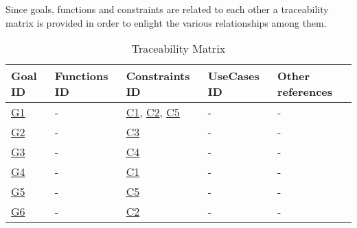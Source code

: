 Since goals, functions and constraints are related to each other a traceability matrix is provided in order to enlight the various relationships among them.
\begin{flushleft}

\begin{table}[htp]

\begin{tabular}{|l|l|l|l|l|}
\hline
Goal ID&Functions ID&Constraints ID&UseCases ID&Other references\\
\hline
\hyperlink{G1}{G1}&-&\hyperlink{C1}{C1}, \hyperlink{C2}{C2}, \hyperlink{C5}{C5}&-&-\\
\hline
\hyperlink{G2}{G2}&-&\hyperlink{C3}{C3}&-&-\\
\hline
\hyperlink{G3}{G3}&-&\hyperlink{C4}{C4}&-&-\\
\hline
\hyperlink{G4}{G4}&-&\hyperlink{C1}{C1}&-&-\\
\hline
\hyperlink{G5}{G5}&-&\hyperlink{C5}{C5}&-&-\\
\hline
\hyperlink{G6}{G6}&-&\hyperlink{C2}{C2}&-&-\\
\hline

\end{tabular}

\caption{Traceability Matrix} 

\end{table}

\end{flushleft}